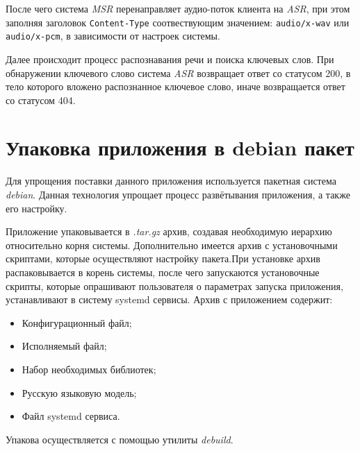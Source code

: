 После чего система \textit{MSR} перенаправляет аудио-поток клиента на \textit{ASR},
при этом заполняя заголовок \texttt{Content-Type} соотвествующим \linebreak
значением: \texttt{audio/x-wav} или \texttt{audio/x-pcm}, в зависимости от
настроек \linebreak системы.

Далее происходит процесс распознавания речи и поиска ключевых слов. При обнаружении
ключевого слово система \textit{ASR} возвращает ответ со статусом 200, в тело которого
вложено распознанное ключевое слово, иначе возвращается ответ со статусом 404.

\section{Упаковка приложения в debian пакет}

Для упрощения поставки данного приложения используется пакетная система \textit{debian}.
Данная технология упрощает процесс развётывания приложения, а также его настройку.

Приложение упаковывается в \textit{.tar.gz} архив, создавая необходимую иерархию
относительно корня системы. Дополнительно имеется архив с установочными скриптами,
которые осуществляют настройку пакета.При установке архив распаковывается
в корень системы, после чего запускаются установочные скрипты, которые
опрашивают пользователя о параметрах запуска приложения, устанавливают в систему
systemd сервисы. Архив с приложением содержит:
\begin{itemize}
    \item Конфигурационный файл;
    \item Исполняемый файл;
    \item Набор необходимых библиотек;
    \item Русскую языковую модель;
    \item Файл systemd сервиса.
\end{itemize}

Упакова осуществляется с помощью утилиты \textit{debuild}.
